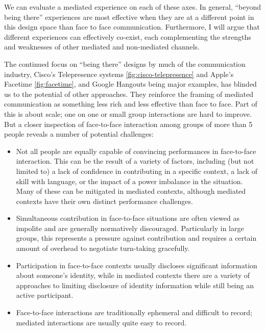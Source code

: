 We can evaluate a mediated experience on each of these axes. In general, ``beyond being there'' experiences are most effective when they are at a different point in this design space than face to face communication. Furthermore, I will argue that different experiences can effectively co-exist, each complementing the strengths and weaknesses of other mediated and non-mediated channels.

The continued focus on ``being there'' designs by much of the communication industry, Cisco's Telepresence systems \ref{fig:cisco-telepresence} and Apple's Facetime \ref{fig:facetime}, and Google Hangouts being major examples, has blinded us to the potential of other approaches. They reinforce the framing of mediated communication as something less rich and less effective than face to face. Part of this is about scale; one on one or small group interactions are hard to improve. But a closer inspection of face-to-face interaction among groups of more than 5 people reveals a number of potential challenges:


\begin{itemize}
\item Not all people are equally capable of convincing performances in face-to-face interaction. This can be the result of a variety of factors, including (but not limited to) a lack of confidence in contributing in a specific context, a lack of skill with language, or the impact of a power imbalance in the situation. Many of these can be mitigated in mediated contexts\citep{Siegel:1986ve}, although mediated contexts have their own distinct performance challenges.
\item Simultaneous contribution in face-to-face situations are often viewed as impolite and are generally normatively discouraged. Particularly in large groups, this represents a pressure against contribution and requires a certain amount of overhead to negotiate turn-taking gracefully.
\item Participation in face-to-face contexts usually discloses significant information about someone's identity, while in mediated contexts there are a variety of approaches to limiting disclosure of identity information while still being an active participant.
\item Face-to-face interactions are traditionally ephemeral and difficult to record; mediated interactions are usually quite easy to record. 
\end{itemize}




